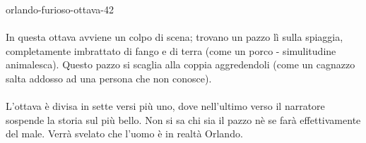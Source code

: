 \documentclass[preview]{standalone}
\begin{document}
\begin{snippet}{orlando-furioso-ottava-42}
    \\\\
    In questa ottava avviene un colpo di scena; trovano un pazzo lì sulla spiaggia,
    completamente imbrattato di fango e di terra (come un porco - simulitudine animalesca).
    Questo pazzo si scaglia alla coppia aggredendoli
    (come un cagnazzo salta addosso ad una persona che non conosce).
    \\\\
    L'ottava è divisa in sette versi più uno, dove nell'ultimo verso
    il narratore sospende la storia sul più bello.
    Non si sa chi sia il pazzo nè se farà effettivamente del male.
    Verrà svelato che l'uomo è in realtà Orlando.
\end{snippet}
\end{document}
